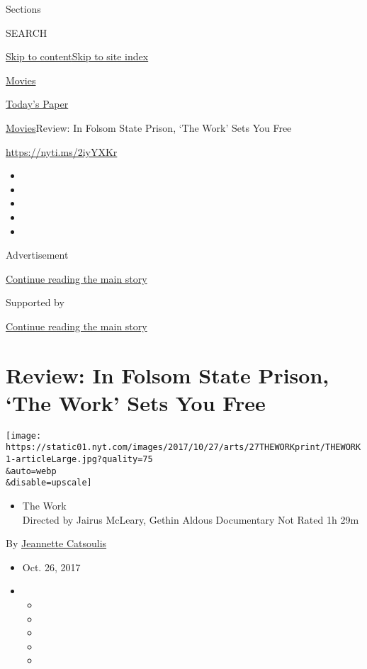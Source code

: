 Sections

SEARCH

\protect\hyperlink{site-content}{Skip to
content}\protect\hyperlink{site-index}{Skip to site index}

\href{https://www.nytimes.com/section/movies}{Movies}

\href{https://myaccount.nytimes.com/auth/login?response_type=cookie\&client_id=vi}{}

\href{https://www.nytimes.com/section/todayspaper}{Today's Paper}

\href{/section/movies}{Movies}\textbar{}Review: In Folsom State Prison,
`The Work' Sets You Free

\href{https://nyti.ms/2iyYXKr}{https://nyti.ms/2iyYXKr}

\begin{itemize}
\item
\item
\item
\item
\item
\end{itemize}

Advertisement

\protect\hyperlink{after-top}{Continue reading the main story}

Supported by

\protect\hyperlink{after-sponsor}{Continue reading the main story}

\hypertarget{review-in-folsom-state-prison-the-work-sets-you-free}{%
\section{Review: In Folsom State Prison, `The Work' Sets You
Free}\label{review-in-folsom-state-prison-the-work-sets-you-free}}

\texttt{[image: https://static01.nyt.com/images/2017/10/27/arts/27THEWORKprint/THEWORK1-articleLarge.jpg?quality=75\\\&auto=webp\\\&disable=upscale]}

\begin{itemize}
\tightlist
\item
  The Work\\
  Directed by Jairus McLeary, Gethin Aldous Documentary Not Rated 1h 29m
\end{itemize}

By \href{https://www.nytimes.com/by/jeannette-catsoulis}{Jeannette
Catsoulis}

\begin{itemize}
\item
  Oct. 26, 2017
\item
  \begin{itemize}
  \item
  \item
  \item
  \item
  \item
  \end{itemize}
\end{itemize}

